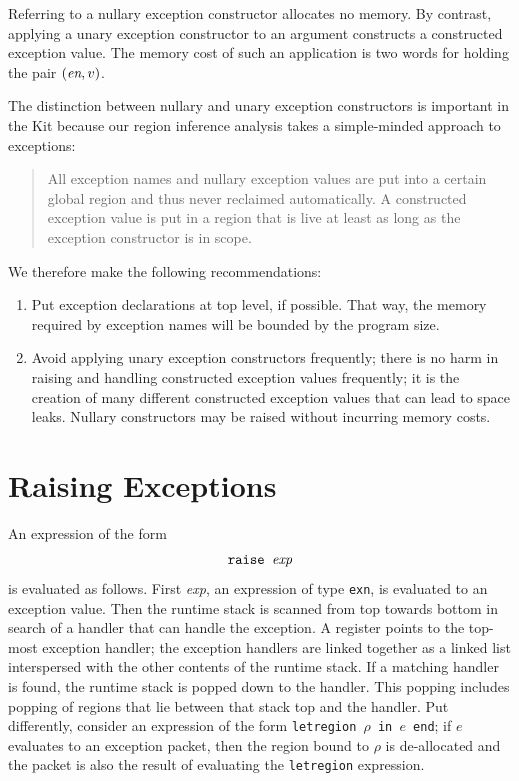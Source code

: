 \documentclass[12pt]{book}
\begin{document}
Referring to a nullary exception constructor allocates no memory. By
contrast, applying a unary exception constructor to an argument
constructs a constructed exception value. The memory cost of such an
application is two words for holding the pair $(\hbox{\it en}, v)$.

The distinction between nullary and unary exception constructors is
important in the Kit because our region inference analysis takes a
simple-minded approach to exceptions:
\begin{quote}
  All exception names and nullary exception values are put into a
  certain
  global region and thus never reclaimed automatically. A constructed
  exception value is put in a region that is live at least as long as
  the exception constructor is in scope.
\end{quote}
We therefore make the following recommendations:
\begin{enumerate}
\item Put exception declarations at top level, if possible.  That way,
  the memory required by exception names will be bounded by the
  program size.
\item Avoid applying unary exception constructors frequently; there is
  no harm in raising and handling constructed exception values
  frequently; it is the creation of many different constructed
  exception values that can lead to space leaks. Nullary constructors
  may be raised without incurring memory costs.
\end{enumerate}

\section{Raising Exceptions}
An expression of the form 
%
$$\hbox{\tt raise {\it exp}}$$
is evaluated as follows. First {\it exp},
an expression of type {\tt exn}, is evaluated to an exception value.
Then the runtime
%
stack is scanned from top towards bottom in search of a handler that
can handle the exception. A register points to the top-most exception
handler; the exception handlers are linked together as a linked list
interspersed with the other contents of the runtime stack.  If a
matching handler is found, the runtime stack is popped down to the
handler. This popping includes popping of regions that lie between
that stack top and the handler. Put differently, consider an
expression of the form
%
{\tt letregion $\rho$ in $e$ end}; if $e$ evaluates to an exception
packet, then the region bound to $\rho$ is de-allocated and the packet
is also the result of evaluating the \texttt{letregion} expression.
\end{document}
